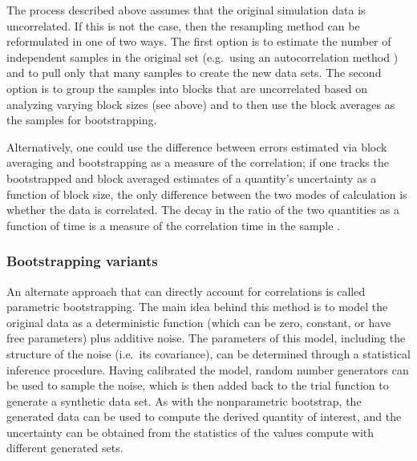 The process described above assumes that the original simulation data is uncorrelated.  If this is not the case, then the resampling method can be reformulated in one of two ways.  The first option is to estimate the number of independent samples in the original set (e.g.\ using an autocorrelation method \cite{Chodera-2016,Lyman2007a}) and to pull only that many samples to create the new data sets.  The second option is to group the samples into blocks that are uncorrelated based on analyzing varying block sizes (see above) and to then use the block averages as the samples for bootstrapping.

Alternatively, one could use the difference between errors estimated via block averaging and bootstrapping as a measure of the correlation; if one tracks the bootstrapped and block averaged estimates of a quantity's uncertainty as a function of block size, the only difference between the two modes of calculation is whether the data is correlated.  The decay in the ratio of the two quantities as a function of time is a measure of the correlation time in the sample \cite{Romo2011}.

\subsubsection{Bootstrapping variants}

An alternate approach that can directly account for correlations is called parametric bootstrapping.  The main idea behind this method is to model the original data as a deterministic function (which can be zero, constant, or have free parameters) plus additive noise.  The parameters of this model, including the structure of the noise (i.e.\ its covariance), can be determined through a statistical inference procedure.  Having calibrated the model, random number generators can be used to sample the noise, which is then added back to the trial function to generate a synthetic data set.   As with the nonparametric bootstrap, the generated data can be used to compute the derived quantity of interest, and the uncertainty can be obtained from the statistics of the values compute with different generated sets.

